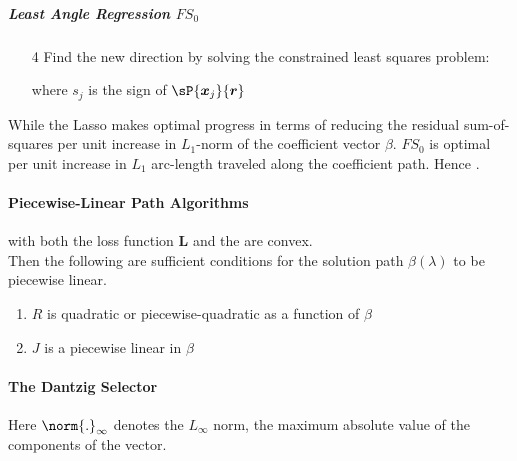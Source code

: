 \subparagraph{Least Angle Regression $FS_{0}$}
\begin{itemize}
	\item[4] Find the new direction by solving the constrained least squares problem:
		\begin{center}
		\end{center}
		where $s_{j}$ is the sign of $\sP{\bm{x}_{j}}{
		\bm{r}}$
\end{itemize}
While the Lasso makes optimal progress in terms of reducing the residual sum-of-squares per unit
increase in $L_{1}$-norm of the coefficient vector $\beta$. $FS_{0}$ is optimal per unit increase
in $L_{1}$ arc-length traveled along the coefficient path. Hence .

\paragraph{Piecewise-Linear Path Algorithms}
\begin{center}
\end{center}
with both the loss function $\bm{L}$ and the  are convex.\\
Then the following are sufficient conditions for the solution path $\beta(\lambda)$ to be piecewise
linear.
\begin{enumerate}
	\item $R$ is quadratic or piecewise-quadratic as a function of $\beta$
	\item $J$ is a piecewise linear in $\beta$
\end{enumerate}

\paragraph{The Dantzig Selector}
\begin{center}
\end{center}
Here $\norm{.}_{\infty}$ denotes the $L_{\infty}$ norm, the maximum absolute 
value of the components of the vector.

